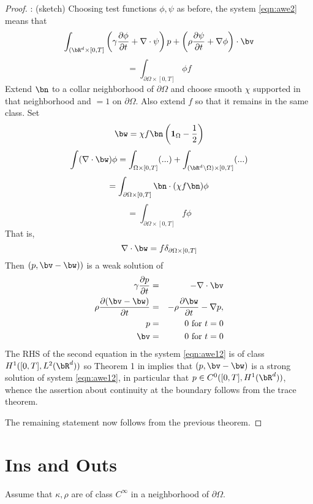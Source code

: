 \begin{proof}: (sketch) Choosing test functions $\phi,\psi$ as before, the
system \ref{eqn:awe2} means that
\[
\int_{(\bR^d \times [0,T]}\left (\gamma \frac{\partial \phi}{\partial t} +
\nabla \cdot {\bf \psi}\right)p + \left(\rho\frac{\partial {\bf
    \psi}}{\partial t}
  + \nabla \phi\right) \cdot \bv
\]
\[
= \int_{\partial \Omega \times [0,T]} \phi f
\]
Extend $\bn$ to a collar neighborhood of $\partial \Omega$ and choose
smooth $\chi$ supported in that neighborhood and $=1$ on $\partial
\Omega$. Also extend $f$ so that it remains in the same class. Set
\[
\bw = \chi f \bn \left({\bf 1}_{\Omega} - \frac{1}{2}\right)
\]
\[
\int (\nabla \cdot \bw)  \phi = \int_{\Omega \times [0,T]}(...) + \int_{(\bR^d
  \setminus \Omega) \times [0,T]}(...) 
\]
\[
= \int_{\partial \Omega \times [0,T]} \bn \cdot (\chi f \bn) \phi
\]
\[
= \int_{\partial \Omega \times [0,T]} f  \phi
\]
That is,
\[
 \nabla \cdot \bw = f \delta_{\partial \Omega \times [0,T]}
\]
Then $(p,\bv-\bw))$ is a weak solution of 
\begin{eqnarray}
\label{eqn:awe12}
\gamma \frac{\partial p}{\partial t} & = & - \nabla \cdot \bv \nonumber \\
\rho \frac{\partial (\bv-\bw)}{\partial t} & = & -\rho \frac{\partial\bw}{\partial t} - \nabla p,\nonumber \\
p & =& 0 \mbox{ for } t= 0\nonumber\\ 
\bv & = & 0 \mbox{ for } t= 0
\end{eqnarray}
The RHS of the second equation in the system \ref{eqn:awe12} is of class $H^1([0,T],L^2(\bR^d))$ so Theorem 1 in
\cite{BlazekStolkSymes:13} implies that $(p, \bv-\bw)$ is a strong
solution of system \ref{eqn:awe12}, in particular that $p \in C^0([0,T],H^1(\bR^d))$,
whence the assertion about continuity at the boundary follows from the
trace theorem.

The remaining statement now follows from the previous theorem.
\end{proof}

\section{Ins and Outs}
Assume that $\kappa, \rho$ are of class $C^{\infty}$ in a neighborhood
of $\partial \Omega$. 

